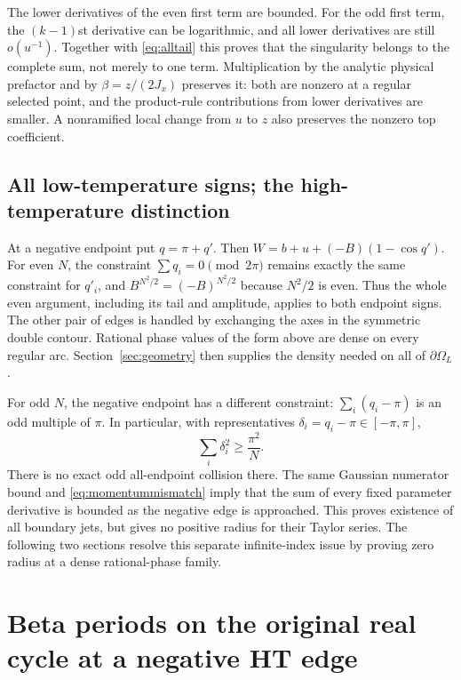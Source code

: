 \documentclass[11pt]{article}
\numberwithin{equation}{section}
\theoremstyle{definition}
\newcommand{\OL}{\Omega_L}
\begin{document}
The lower derivatives of the even first term are bounded. For the odd
first term, the $(k-1)$st derivative can be logarithmic, and all lower
derivatives are still $o(u^{-1})$. Together with
\eqref{eq:alltail} this proves that the singularity belongs to the
complete sum, not merely to one term. Multiplication by the analytic
physical prefactor and by $\beta=z/(2J_x)$ preserves it: both are
nonzero at a regular selected point, and the product-rule contributions
from lower derivatives are smaller. A nonramified local change from
$u$ to $z$ also preserves the nonzero top coefficient.

\subsection{All low-temperature signs; the high-temperature distinction}
At a negative endpoint put $q=\pi+q'$. Then
$W=b+u+(-B)(1-\cos q')$. For even $N$, the constraint
$\sum q_i=0\pmod{2\pi}$ remains exactly the same constraint for
$q'_i$, and $B^{N^2/2}=(-B)^{N^2/2}$ because $N^2/2$ is even.
Thus the whole even argument, including its tail and amplitude, applies
to both endpoint signs. The other pair of edges is handled by exchanging
the axes in the symmetric double contour. Rational phase values of the
form above are dense on every regular arc. Section~\ref{sec:geometry}
then supplies the density needed on all of $\partial\OL$.

For odd $N$, the negative endpoint has a different constraint:
$\sum_i(q_i-\pi)$ is an odd multiple of $\pi$. In particular, with
representatives $\delta_i=q_i-\pi\in[-\pi,\pi]$,
\begin{equation}\label{eq:momentummismatch}
 \sum_i\delta_i^2\ge\frac{\pi^2}{N}.
\end{equation}
There is no exact odd all-endpoint collision there. The same Gaussian
numerator bound and \eqref{eq:momentummismatch} imply that the sum of
every fixed parameter derivative is bounded as the negative edge is
approached. This proves existence of all boundary jets, but gives no
positive radius for their Taylor series. The following two sections
resolve this separate infinite-index issue by proving zero radius at
a dense rational-phase family.



\section{Beta periods on the original real cycle at a negative HT edge}
\label{sec:realcycle}
\end{document}
